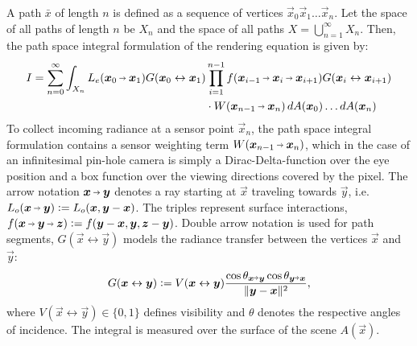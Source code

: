 A path $\bar{x}$ of length $n$ is defined as a sequence of vertices $\vec{x}_0 \vec{x}_1 \dots \vec{x}_n$.
Let the space of all paths of length $n$ be $X_n$ and the space of all paths $X = \bigcup_{n=1}^{\infty} X_n$.
Then, the path space integral formulation of the rendering equation is given by:
\begin{equation}
\label{eq:path_space_integral}
\begin{aligned}
    I
    = \sum_{n=0}^{\infty} \int_{X_n} L_e(\pdir{0}{1}) \G{0}{1} &\prod_{i=1}^{n - 1} \f{i-1}{i}{i+1} \G{i}{i+1}\\
    &\cdot W(\pdir{n-1}{n}) \diff A(\vec{x}_0) \dots \diff A(\vec{x}_n)
\end{aligned}
\end{equation}
To collect incoming radiance at a sensor point $\vec{x}_n$, the path space integral formulation contains a sensor weighting term $W(\pdir{n-1}{n})$, which in the case of an infinitesimal pin-hole camera is simply a Dirac-Delta-function over the eye position and a box function over the viewing directions covered by the pixel.
The arrow notation $\vec{x} \pto \vec{y}$ denotes a ray starting at $\vec{x}$ traveling towards $\vec{y}$, i.e. $L_o(\vec{x} \pto \vec{y}) \defeq L_o(\vec{x}, \vec{y} - \vec{x})$.
The triples represent surface interactions, $f(\vec{x} \pto \vec{y} \pto \vec{z}) \defeq f(\vec{y} - \vec{x}, \vec{y}, \vec{z} - \vec{y})$. 
Double arrow notation is used for path segments, $G(\vec{x} \leftrightarrow \vec{y})$ models the radiance transfer between the vertices $\vec{x}$ and $\vec{y}$:
\begin{equation}
\label{eq:transfer}
G(\vec{x} \leftrightarrow \vec{y}) \defeq V(\vec{x} \leftrightarrow \vec{y}) \frac{\cos \theta_{\vec{x} \veryshortarrow \vec{y}} \cos \theta_{\vec{y} \veryshortarrow \vec{x}}}{\|\vec{y} - \vec{x}\|^2},
\end{equation}
where $V(\vec{x} \leftrightarrow \vec{y}) \in \{0,1\}$ defines visibility and $\theta$ denotes the respective angles of incidence.
The integral is measured over the surface of the scene $A(\vec{x})$.

